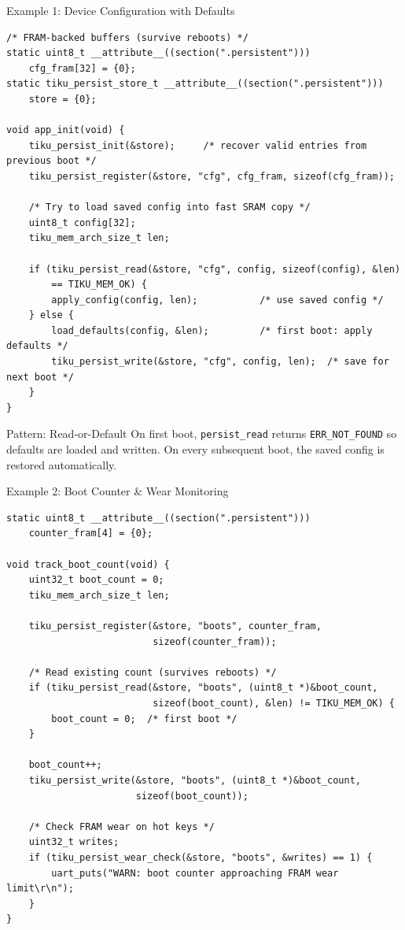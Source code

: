 \documentclass[aspectratio=169, 10pt]{beamer}
\begin{document}
\begin{frame}[fragile]{Example 1: Device Configuration with Defaults}
\begin{lstlisting}[style=cstyle]
/* FRAM-backed buffers (survive reboots) */
static uint8_t __attribute__((section(".persistent")))
    cfg_fram[32] = {0};
static tiku_persist_store_t __attribute__((section(".persistent")))
    store = {0};

void app_init(void) {
    tiku_persist_init(&store);     /* recover valid entries from previous boot */
    tiku_persist_register(&store, "cfg", cfg_fram, sizeof(cfg_fram));

    /* Try to load saved config into fast SRAM copy */
    uint8_t config[32];
    tiku_mem_arch_size_t len;

    if (tiku_persist_read(&store, "cfg", config, sizeof(config), &len)
        == TIKU_MEM_OK) {
        apply_config(config, len);           /* use saved config */
    } else {
        load_defaults(config, &len);         /* first boot: apply defaults */
        tiku_persist_write(&store, "cfg", config, len);  /* save for next boot */
    }
}
\end{lstlisting}

\vspace{0.3em}
\begin{block}{Pattern: Read-or-Default}
On first boot, \texttt{persist\_read} returns \texttt{ERR\_NOT\_FOUND} so
defaults are loaded and written. On every subsequent boot, the saved
config is restored automatically.
\end{block}
\end{frame}

\begin{frame}[fragile]{Example 2: Boot Counter \& Wear Monitoring}
\begin{lstlisting}[style=cstyle]
static uint8_t __attribute__((section(".persistent")))
    counter_fram[4] = {0};

void track_boot_count(void) {
    uint32_t boot_count = 0;
    tiku_mem_arch_size_t len;

    tiku_persist_register(&store, "boots", counter_fram,
                          sizeof(counter_fram));

    /* Read existing count (survives reboots) */
    if (tiku_persist_read(&store, "boots", (uint8_t *)&boot_count,
                          sizeof(boot_count), &len) != TIKU_MEM_OK) {
        boot_count = 0;  /* first boot */
    }

    boot_count++;
    tiku_persist_write(&store, "boots", (uint8_t *)&boot_count,
                       sizeof(boot_count));

    /* Check FRAM wear on hot keys */
    uint32_t writes;
    if (tiku_persist_wear_check(&store, "boots", &writes) == 1) {
        uart_puts("WARN: boot counter approaching FRAM wear limit\r\n");
    }
}
\end{lstlisting}
\end{frame}
\end{document}
